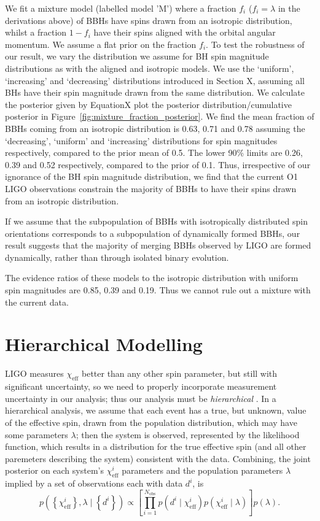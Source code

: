 \documentclass[modern,linenumbers]{aastex61}
\newcommand{\chieff}{\chi_\mathrm{eff}}
\begin{document}
We fit a mixture model (labelled model 'M') where a fraction $f_i$ ($f_i=\lambda$ in the derivations above) of BBHs have spins drawn from an isotropic distribution, whilst a fraction $1 - f_i$ have their spins aligned with the orbital angular momentum. We assume a flat prior on the fraction $f_i$. To test the robustness of our result, we vary the distribution we assume for BH spin magnitude distributions as with the aligned and isotropic models. We use the `uniform', `increasing' and `decreasing' distributions introduced in Section X, assuming all BHs have their spin magnitude drawn from the same distribution. We calculate the posterior given by EquationX plot the posterior distribution/cumulative posterior in Figure~\ref{fig:mixture_fraction_posterior}. We find the mean fraction of BBHs coming from an isotropic distribution is 0.63, 0.71 and 0.78 assuming the `decreasing', `uniform' and `increasing' distributions for spin magnitudes respectively, compared to the prior mean of 0.5. The lower 90\% limits are 0.26, 0.39 and 0.52 respectively, compared to the prior of 0.1. Thus, irrespective of our ignorance of the BH spin magnitude distribution, we find that the current O1 LIGO observations constrain the majority of BBHs to have their spins drawn from an isotropic distribution. 

If we assume that the subpopulation of BBHs with isotropically distributed spin orientations corresponds to a subpopulation of dynamically formed BBHs, our result suggests that the majority of merging BBHs observed by LIGO are formed dynamically, rather than through isolated binary evolution.

The evidence ratios of these models to the isotropic distribution with uniform spin magnitudes are 0.85, 0.39 and 0.19. Thus we cannot rule out a mixture with the current data. 


\section{Hierarchical Modelling} 
\label{sec:hierarchical}

LIGO measures $\chieff$ better than any other spin parameter, but
still with significant uncertainty, so we need to properly incorporate
measurement uncertainty in our analysis; thus our analysis must be
\emph{hierarchical} \citep{2010ApJ...725.2166H,2010PhRvD..81h4029M}.
In a hierarchical analysis, we assume that each event has a true, but
unknown, value of the effective spin, drawn from the population
distribution, which may have some parameters $\lambda$; then the
system is observed, represented by the likelihood function, which
results in a distribution for the true effective spin (and all other
paremeters describing the system) consistent with the data.
Combining, the joint posterior on each system's $\chieff^i$ parameters
and the population parameters $\lambda$ implied by a set of
observations each with data $d^i$, is
\begin{equation}
  p\left( \left\{ \chieff^i \right\}, \lambda \mid \left\{ d^i \right\} \right) \propto \left[ \prod_{i=1}^{N_\mathrm{obs}} p\left(d^i \mid \chieff^i \right) p\left( \chieff^i \mid \lambda \right) \right] p\left(\lambda\right).
\end{equation}
\end{document}
